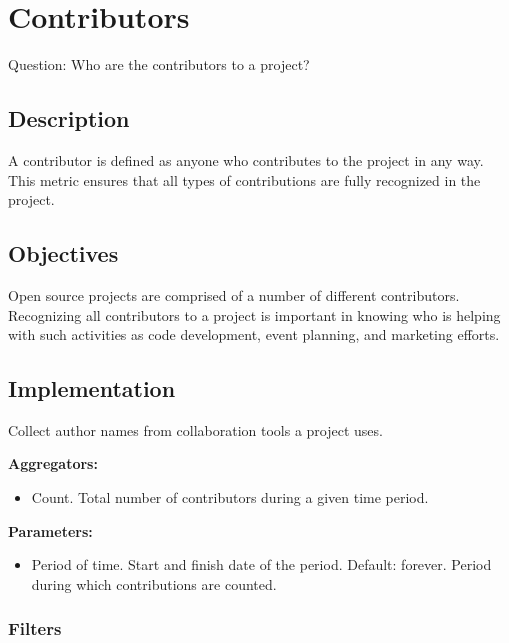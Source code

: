 \hypertarget{contributors}{%
\section{Contributors}\label{contributors}}

Question: Who are the contributors to a project?

\hypertarget{description}{%
\subsection{Description}\label{description}}

A contributor is defined as anyone who contributes to the project in any
way. This metric ensures that all types of contributions are fully
recognized in the project.

\hypertarget{objectives}{%
\subsection{Objectives}\label{objectives}}

Open source projects are comprised of a number of different
contributors. Recognizing all contributors to a project is important in
knowing who is helping with such activities as code development, event
planning, and marketing efforts.

\hypertarget{implementation}{%
\subsection{Implementation}\label{implementation}}

Collect author names from collaboration tools a project uses.

\textbf{Aggregators:}

\begin{itemize}
\tightlist
\item
  Count. Total number of contributors during a given time period.
\end{itemize}

\textbf{Parameters:}

\begin{itemize}
\tightlist
\item
  Period of time. Start and finish date of the period. Default: forever.
  Period during which contributions are counted.
\end{itemize}

\hypertarget{filters}{%
\subsubsection{Filters}\label{filters}}

